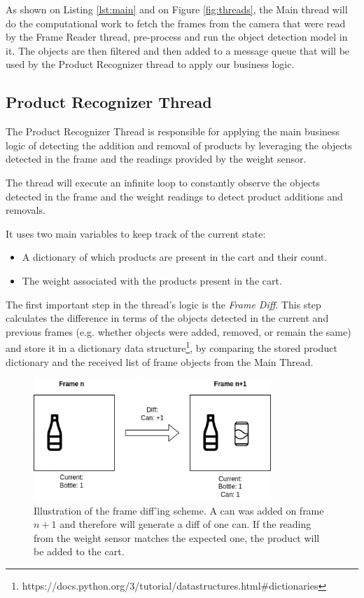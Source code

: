\documentclass[openright]{normas-utf-tex} %
\begin{document}
As shown on Listing \ref{lst:main} and on Figure \ref{fig:threads}, the Main
thread will do the computational work to fetch the frames from the camera that
were read by the Frame Reader thread, pre-process and run the object detection
model in it. The objects are then filtered and then added to a message queue
that will be used by the Product Recognizer thread to apply our business logic.

\subsection{Product Recognizer Thread}

The Product Recognizer Thread is responsible for applying the main business
logic of detecting the addition and removal of products by leveraging the
objects detected in the frame and the readings provided by the weight sensor.

The thread will execute an infinite loop to constantly observe the objects
detected in the frame and the weight readings to detect product additions
and removals.

It uses two main variables to keep track of the current state:
\begin{itemize}
    \item A dictionary of which products are present in the cart and their count.
    \item The weight associated with the products present in the cart.
\end{itemize}

The first important step in the thread's logic is the \textit{Frame Diff}. This step 
calculates the difference in terms of the objects detected in the current 
and previous frames (e.g. whether objects were added, removed, or remain the same) 
and store it in a dictionary data structure\footnote{https://docs.python.org/3/tutorial/datastructures.html\#dictionaries},
by comparing the stored product dictionary and the received list of frame
objects from the Main Thread.

\begin{figure}[H]
	\centering
	\includegraphics[width=0.8\textwidth]{./images/diagrams/framediff.png}
	\caption[Illustration of the frame diff'ing scheme]{Illustration of the frame diff'ing scheme. A can was added on frame $n+1$ and therefore will generate a diff of one can. If the reading from the weight sensor matches the expected one, the product will be added to the cart.}
    \label{fig:diff}
\end{figure}
\end{document}
